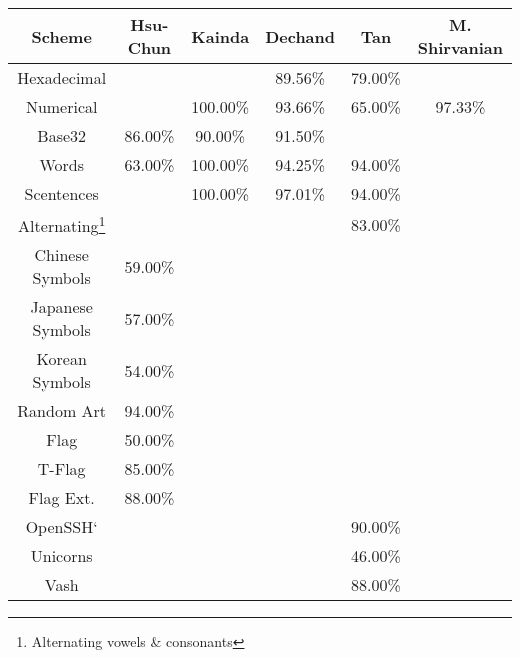 \begin{tabular}{c|ccccc}
    \toprule
    \textbf{Scheme} 
    & Hsu-Chun\cite{hsiao2009study}      
    & Kainda\cite{kainda2009usability}      
    & Dechand\cite{dechand2016empirical}
    & Tan\cite{tan2017can}      
    & M. Shirvanian\cite{shirvanian2017pitfalls}
    \\\hline
    Hexadecimal     &           &           & 89.56\% & 79.00\% &               \\
    Numerical       &           & 100.00\%  & 93.66\% & 65.00\% & 97.33\%       \\
    Base32          & 86.00\%   & 90.00\%   & 91.50\% &         &               \\
    Words           & 63.00\%   & 100.00\%  & 94.25\% & 94.00\% &               \\
    Scentences      &           & 100.00\%  & 97.01\% & 94.00\% &               \\
    Alternating\footnote{Alternating vowels \& consonants} &&&& 83.00\% &       \\
    Chinese Symbols & 59.00\%   &           &         &         &               \\
    Japanese Symbols& 57.00\%   &           &         &         &               \\
    Korean Symbols  & 54.00\%   &           &         &         &               \\
    \midrule
    Random Art	     & 94.00\%   &&&&\\
    Flag    	     & 50.00\%   &&&&\\
    T-Flag  	     & 85.00\%   &&&&\\
    Flag Ext.	     & 88.00\%   &&&&\\
    OpenSSH`         &&&& 90.00\% &\\
    Unicorns         &&&& 46.00\% &\\
    Vash             &&&& 88.00\% &\\
    \bottomrule
\end{tabular}